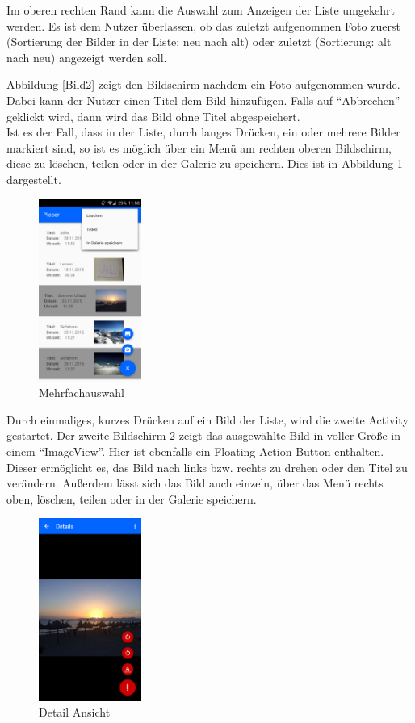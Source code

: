 Im oberen rechten Rand kann die Auswahl zum Anzeigen der Liste umgekehrt werden. Es ist dem Nutzer überlassen, ob das zuletzt aufgenommen Foto zuerst (Sortierung der Bilder in der Liste: neu nach alt) oder zuletzt (Sortierung: alt nach neu) angezeigt werden soll.



Abbildung \ref{Bild2} zeigt den Bildschirm nachdem ein Foto aufgenommen wurde.
Dabei kann der Nutzer einen Titel dem Bild hinzufügen. Falls auf \enquote{Abbrechen}
 geklickt wird, dann wird das Bild ohne Titel abgespeichert.\\

Ist es der Fall, dass in der Liste, durch langes Drücken, ein oder mehrere Bilder markiert sind, so ist es möglich über ein Menü am rechten oberen Bildschirm, diese zu löschen, teilen oder in der Galerie zu speichern. Dies ist in Abbildung \ref{Bild3} dargestellt.\begin{figure}[H]
\label{Bild3}
\centering
\includegraphics[width=0.3\textwidth]{images/bild_3}
\caption{Mehrfachauswahl}
\end{figure}

Durch einmaliges, kurzes Drücken auf ein Bild der Liste, wird die zweite Activity
gestartet. Der zweite Bildschirm \ref{Bild4} zeigt das ausgewählte Bild in voller Größe in einem \enquote{ImageView}. Hier ist ebenfalls ein Floating-Action-Button enthalten. Dieser ermöglicht es, das Bild nach links bzw. rechts zu drehen oder den Titel zu verändern.
Außerdem lässt sich das Bild auch einzeln, über das Menü rechts oben, löschen, teilen oder in der Galerie speichern.

\begin{figure}[H]
\label{Bild4}
\begin{center}
\includegraphics[width=0.3\textwidth]{images/bild_4}
\end{center}

\caption{Detail Ansicht}
\end{figure}

